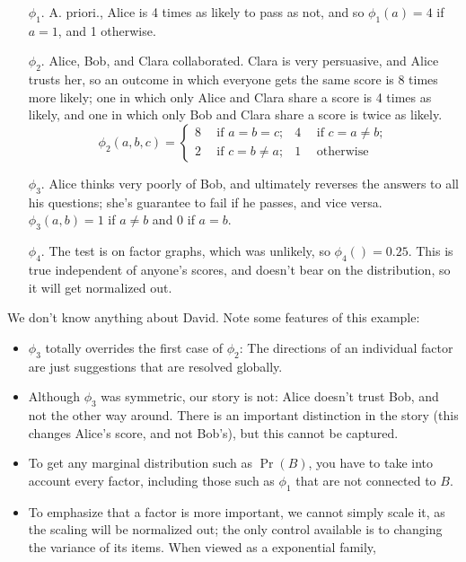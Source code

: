 \documentclass{article}
\numberwithin{equation}{section}
\begin{document}
\begin{example}
		
		\begin{enumerate}[nosep]
			\item[$\phi_1$.] A. priori., Alice is 4 times as likely to pass as not, and so $\phi_1(a) = 4$ if $a = 1$, and 1 otherwise.
			\item[$\phi_2$.] Alice, Bob, and Clara collaborated. Clara is very persuasive, and Alice trusts her, so an outcome in which everyone gets the same score is 8 times more likely; one in which only Alice and Clara share a score is 4 times as likely, and one in which only Bob and Clara share a score is twice as likely.
			\[ \phi_2(a,b,c) = \left\{\begin{aligned}
				8 &~~ \text{if~} a = b = c; &
				4 &~~ \text{if~}c = a \neq b; \\
				2 &~~ \text{if~}c = b \neq a; &
				1 &~~ \text{otherwise}
			\end{aligned}\right. \]
			\item[$\phi_3$.] Alice thinks very poorly of Bob, and ultimately reverses the answers to all his questions; she's guarantee to fail if he passes, and vice versa. $\phi_3(a,b) = 1$ if $a \neq b$ and 0 if $a=b$.
			\item[$\phi_4$.] The test is on factor graphs, which was unlikely, so $\phi_4() = 0.25$. This is true independent of anyone's scores, and doesn't bear on the distribution, so it will get normalized out.
		\end{enumerate}
		We don't know anything about David. 
		Note some features of this example:
		\begin{itemize}[nosep]
			\item $\phi_3$ totally overrides the first case of $\phi_2$: The directions of an individual factor are just suggestions that are resolved globally.
			\item Although $\phi_3$ was symmetric, our story is not: Alice doesn't trust Bob, and not the other way around. There is an important distinction in the story (this changes Alice's score, and not Bob's), but this cannot be captured.
			\item To get any marginal distribution such as $\Pr(B)$, you have to take into account every factor, including those such as $\phi_1$ that are not connected to $B$.
			\item To emphasize that a factor is more important, we cannot simply scale it, as the scaling will be normalized out; the only control available is to changing the variance of its items. When viewed as a exponential family, 
		\end{itemize}
	\end{example}
\end{document}
